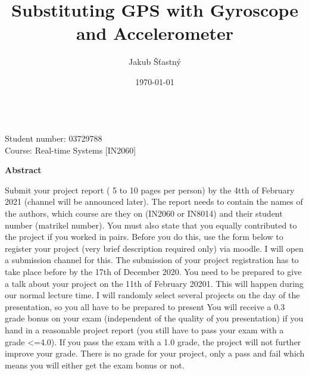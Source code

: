 \documentclass[hidelinks,a4paper]{article}
\author{Jakub Šťastný}
\title{Substituting GPS with Gyroscope and Accelerometer}
\date{\today}
\begin{document}
\begin{titlepage}
    \thispagestyle{plain}
    \begin{center}
        \Large
        \textbf{\@title}
            
        \vspace{0.4cm}
        \large
            
        \vspace{0.8cm}
        \textbf{\@author} \\
        {\small Student number: 03729788}\\
        {\small Course: Real-time Systems [IN2060] }
        
        \vspace{6.9cm}
        \textbf{Abstract}
    \end{center}
    Submit your project report ( 5 to 10 pages per person) by the 4tth of February 2021 (channel will be
    announced later). The report needs to contain the names of the authors, which course are they on
    (IN2060 or IN8014) and their student number (matrikel number). You must also state that you equally
    contributed to the project if you worked in pairs.
    Before you do this, use the form below to register your project (very brief description required only) via
    moodle. I will open a submission channel for this. The submission of your project registration has to take
    place before by the 17th of December 2020.
    You need to be prepared to give a talk about your project on the 11th of February 20201. This will
    happen during our normal lecture time. I will randomly select several projects on the day of the
    presentation, so you all have to be prepared to present
    You will receive a 0.3 grade bonus on your exam (independent of the quality of you presentation) if you
    hand in a reasonable project report (you still have to pass your exam with a grade <=4.0). If you pass the
    exam with a 1.0 grade, the project will not further improve your grade. There is no grade for your
    project, only a pass and fail which means you will either get the exam bonus or not.
\end{titlepage}
\makeatother

\end{document}
